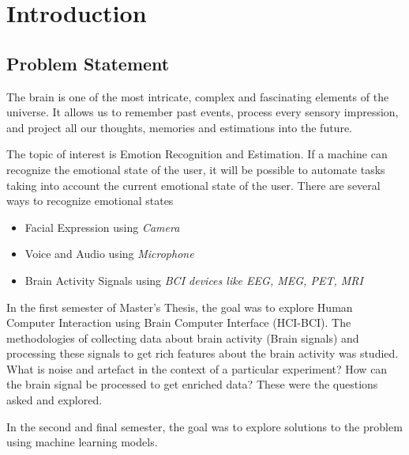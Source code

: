 
\chapter{Introduction} %

\label{Chapter 1} %



\section{Problem Statement}
The brain is one of the most intricate, complex and fascinating elements of the universe. It allows us to remember past events, process every sensory impression, and project all our thoughts, memories and estimations into the future.

The topic of interest is Emotion Recognition and Estimation. If a machine can recognize the emotional state of the user, it will be possible to automate tasks taking into account the current emotional state of the user. There are several ways to recognize emotional states
\begin{itemize}
\item Facial Expression using \emph{Camera}
\item Voice and Audio using \emph{Microphone}
\item Brain Activity Signals using \emph{BCI devices like EEG, MEG, PET, MRI}
\end{itemize}

In the first semester of Master's Thesis, the goal was to explore Human Computer Interaction using Brain Computer Interface (HCI-BCI). The methodologies of collecting data about brain activity (Brain signals) and processing these signals to get rich features about the brain activity was studied. What is noise and artefact in the context of a particular experiment? How can the brain signal be processed to get enriched data? These were the questions asked and explored.

In the second and final semester, the goal was to explore solutions to the problem using machine learning models. 

